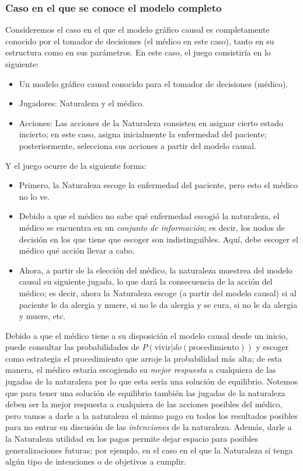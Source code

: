 \documentclass[11pt]{article}
\theoremstyle{plain}
\begin{document}
\subsubsection{Caso en el que se conoce el modelo completo}
Consideremos el caso en el que el modelo gráfico causal es completamente conocido por el tomador de decisiones (el médico en este caso), tanto en su estructura como en sus parámetros. En este caso, el juego consistiría en lo siguiente:\\
\begin{itemize}
\item Un modelo gráfico causal conocido para el tomador de decisiones (médico).
\item Jugadores: Naturaleza y el médico.
\item Acciones: Las acciones de la Naturaleza consisten en asignar cierto estado incierto; en este caso, asigna inicialmente la enfermedad del paciente; posteriormente, selecciona sus acciones a partir del modelo causal.
\end{itemize}
Y el juego ocurre de la siguiente forma:
\begin{itemize}
\item Primero, la Naturaleza escoge la enfermedad del paciente, pero esto el médico no lo ve.
\item Debido a que el médico no sabe qué enfermedad escogió la naturaleza, el médico se encuentra en un \textit{conjunto de información}; es decir, los nodos de decisión en los que tiene que escoger son indistinguibles. Aquí, debe escoger el médico qué acción llevar a cabo. 
\item Ahora, a partir de la elección del médico, la naturaleza muestrea del modelo causal su siguiente jugada, lo que dará la consecuencia de la acción del médico; es decir, ahora la Naturaleza escoge (a partir del modelo causal) si al paciente le da alergia y muere, si no le da alergia y se cura, si no le da alergia y muere, etc.
\end{itemize}
Debido a que el médico tiene a su disposición el modelo causal desde un inicio, puede consultar las probabilidades de $P( \textrm{vivir} | do(\textrm{procedimiento}))$ y escoger como estrategia el procedimiento que arroje la probabilidad más alta; de esta manera, el médico estaría escogiendo su \textit{mejor respuesta} a cualquiera de las jugadas de la naturaleza por lo que esta sería una solución de equilibrio. Notemos que para tener una solución de equilibrio también las jugadas de la naturaleza deben ser la mejor respuesta a cualquiera de las acciones posibles del médico,  pero vamos a darle a la naturaleza el mismo pago en todos los resultados posibles para no entrar en discusión de las \textit{intenciones} de la naturaleza. Además, darle a la Naturaleza utilidad en los pagos permite dejar espacio para posibles generalizaciones futuras; por ejemplo, en el caso en el que la Naturaleza sí tenga algún tipo de intenciones o de objetivos a cumplir.\\
\end{document}
